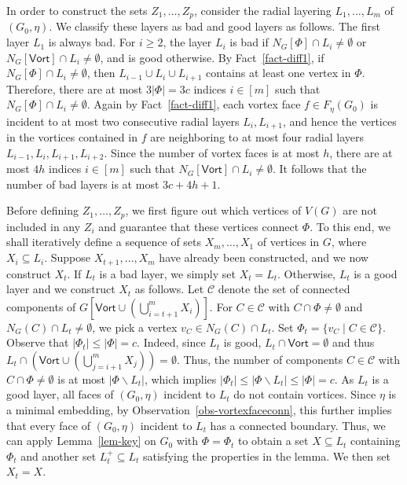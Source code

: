 \documentclass[a4paper,11pt]{article}
\numberwithin{lemma}{section}
\begin{document}
In order to construct the sets $Z_1,\dots,Z_p$, consider the radial layering $L_1,\dots,L_m$ of $(G_0,\eta)$.
We classify these layers as bad and good layers as follows.
The first layer $L_1$ is always bad.
For $i \geq 2$, the layer $L_i$ is bad if $N_G[\varPhi] \cap L_i \neq \emptyset$ or $N_G[\mathsf{Vort}] \cap L_i \neq \emptyset$, and is good otherwise.
By Fact~\ref{fact-diff1}, if $N_G[\varPhi] \cap L_i \neq \emptyset$, then $L_{i-1} \cup L_i \cup L_{i+1}$ contains at least one vertex in $\varPhi$.
Therefore, there are at most $3|\varPhi| = 3c$ indices $i \in [m]$ such that $N_G[\varPhi] \cap L_i \neq \emptyset$.
Again by Fact~\ref{fact-diff1}, each vortex face $f \in F_\eta(G_0)$ is incident to at most two consecutive radial layers $L_i,L_{i+1}$, and hence the vertices in the vortices contained in $f$ are neighboring to at most four radial layers $L_{i-1},L_i,L_{i+1},L_{i+2}$.
Since the number of vortex faces is at most $h$, there are at most $4h$ indices $i \in [m]$ such that $N_G[\mathsf{Vort}] \cap L_i \neq \emptyset$.
It follows that the number of bad layers is at most $3c+4h+1$.

Before defining $Z_1,\dots,Z_p$, we first figure out which vertices of $V(G)$ are not included in any $Z_i$ and guarantee that these vertices connect $\varPhi$.
To this end, we shall iteratively define a sequence of sets $X_m,\dots,X_1$ of vertices in $G$, where $X_i \subseteq L_i$.
Suppose $X_{t+1},\dots,X_m$ have already been constructed, and we now construct $X_t$.
If $L_t$ is a bad layer, we simply set $X_t = L_t$.
Otherwise, $L_t$ is a good layer and we construct $X_t$ as follows.
Let $\mathcal{C}$ denote the set of connected components of $G[\mathsf{Vort} \cup (\bigcup_{i=t+1}^m X_i)]$.
For $C \in \mathcal{C}$ with $C \cap \varPhi \neq \emptyset$ and $N_G(C) \cap L_t \neq \emptyset$, we pick a vertex $v_C \in N_G(C) \cap L_t$.
Set $\varPhi_t = \{v_C \mid C \in \mathcal{C}\}$.
Observe that $|\varPhi_t| \leq |\varPhi| = c$.
Indeed, since $L_t$ is good, $L_t \cap \mathsf{Vort} = \emptyset$ and thus $L_t \cap (\mathsf{Vort} \cup (\bigcup_{j=i+1}^m X_j)) = \emptyset$.
Thus, the number of components $C \in \mathcal{C}$ with $C \cap \varPhi \neq \emptyset$ is at most $|\varPhi \backslash L_t|$, which implies $|\varPhi_t| \leq |\varPhi \backslash L_t| \leq |\varPhi| = c$.
As $L_t$ is a good layer, all faces of $(G_0,\eta)$ incident to $L_t$ do not contain vortices.
Since $\eta$ is a minimal embedding, by Observation~\ref{obs-vortexfaceconn}, this further implies that every face of $(G_0,\eta)$ incident to $L_t$ has a connected boundary.
Thus, we can apply Lemma~\ref{lem-key} on $G_0$ with $\varPhi = \varPhi_t$ to obtain a set $X \subseteq L_t$ containing $\varPhi_t$ and another set $L_t^+ \subseteq L_t$ satisfying the properties in the lemma.
We then set $X_t = X$.
\end{document}

